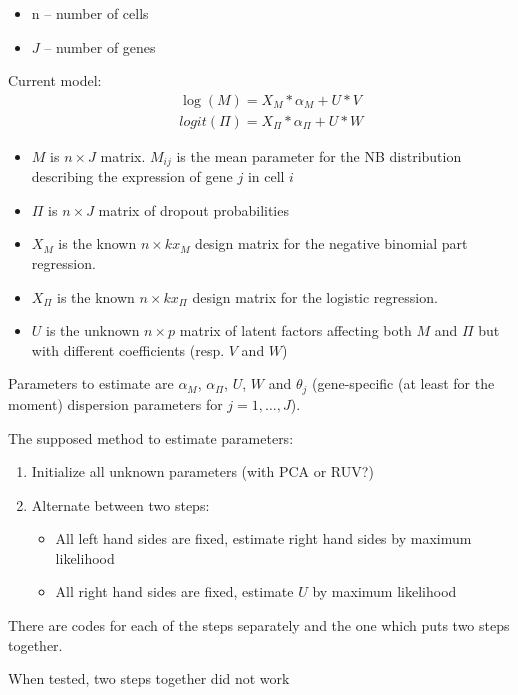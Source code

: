 \documentclass[12pt,a4paper]{article}
\begin{document}
\begin{itemize}
\item n -- number of cells
\item $J$ -- number of genes
\end{itemize}

Current model:
\begin{eqnarray*}
&&\log(M)=X_M*\alpha_M+U*V\\
&&logit(\Pi)=X_{\Pi}*\alpha_{\Pi}+U*W
\end{eqnarray*}
\begin{itemize}
\item $M$ is $n\times J$ matrix. $M_{ij}$ is the mean parameter for the NB distribution describing the expression of gene $j$ in cell $i$
\item $\Pi$ is $n\times J$ matrix of dropout probabilities
\item $X_M$ is the known $n\times kx_M$ design matrix for the negative binomial part regression.
\item $X_{\Pi}$ is the known $n\times kx_\Pi$ design matrix for the logistic regression.
\item $U$ is the unknown $n\times p$ matrix of latent factors affecting both $M$ and $\Pi$ but with different coefficients (resp. $V$ and $W$)
\end{itemize}
Parameters to estimate are $\alpha_M$, $\alpha_\Pi$, $U$, $W$ and $\theta_j$ (gene-specific (at least for the moment) dispersion parameters for $j=1,\ldots,J$). 

\bigskip
\noindent
The supposed method to estimate parameters: 
\begin{enumerate}
\item Initialize all unknown parameters (with PCA or RUV?)
\item Alternate between two steps:
\begin{itemize}
\item All left hand sides are fixed, estimate right hand sides by maximum likelihood
\item All right hand sides are fixed, estimate $U$ by maximum likelihood
\end{itemize}
\end{enumerate}

\bigskip
{}

\bigskip
\noindent There are codes for each of the steps separately and the one which puts two steps together.

\bigskip
\noindent When tested, two steps together did not work
\end{document}
